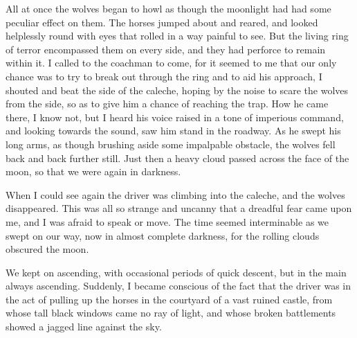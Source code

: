 All at once the wolves began to howl as though the moonlight had had some peculiar effect on them. The horses jumped about and reared, and looked helplessly round with eyes that rolled in a way painful to see. But the living ring of terror encompassed them on every side, and they had perforce to remain within it. I called to the coachman to come, for it seemed to me that our only chance was to try to break out through the ring and to aid his approach, I shouted and beat the side of the caleche, hoping by the noise to scare the wolves from the side, so as to give him a chance of reaching the trap. How he came there, I know not, but I heard his voice raised in a tone of imperious command, and looking towards the sound, saw him stand in the roadway. As he swept his long arms, as though brushing aside some impalpable obstacle, the wolves fell back and back further still. Just then a heavy cloud passed across the face of the moon, so that we were again in darkness. 

When I could see again the driver was climbing into the caleche, and the wolves disappeared. This was all so strange and uncanny that a dreadful fear came upon me, and I was afraid to speak or move. The time seemed interminable as we swept on our way, now in almost complete darkness, for the rolling clouds obscured the moon. 

We kept on ascending, with occasional periods of quick descent, but in the main always ascending. Suddenly, I became conscious of the fact that the driver was in the act of pulling up the horses in the courtyard of a vast ruined castle, from whose tall black windows came no ray of light, and whose broken battlements showed a jagged line against the sky. 
